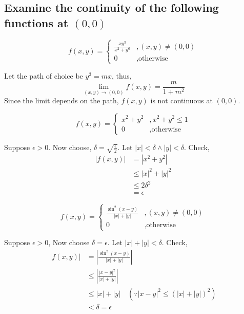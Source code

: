 \subsection{Examine the continuity of the following functions at $(0,0)$}
\begin{asign}
	\[f(x,y)=\begin{cases}
		\frac{xy^3}{x^2+y^6} &, (x,y)\neq(0,0)\\
		0 &, \text{otherwise}
	\end{cases}\]
\end{asign}
\begin{anse}
	Let the path of choice be $y^3=mx$, thus,
	\[\lim\limits_{(x,y)\to(0,0)}f(x,y)=\frac{m}{1+m^2}\]
	Since the limit depends on the path, $f(x,y)$ is not continuous at $(0,0)$.
\end{anse}
\begin{asign}
	\[f(x,y)=\begin{cases}
		x^2+y^2 &, 	x^2+y^2\leq 1\\
		0 &, \text{otherwise}
	\end{cases}\]
\end{asign}
\begin{anse}
	Suppose $\epsilon>0$. Now choose, $\delta=\sqrt{\frac{\epsilon}{2}}$. Let $|x|<\delta\land |y|<\delta$. Check,
	\[\begin{split}
		|f(x,y)|&=|x^2+y^2|\\
		&\leq |x|^2+|y|^2\\
		&\leq 2\delta^2\\
		&=\epsilon
	\end{split}\]
\end{anse}
\begin{asign}
	\[f(x,y)=\begin{cases}
		\frac{\sin^2(x-y)}{|x|+|y|} &, (x,y)\neq(0,0)\\
		0 &, \text{otherwise}
	\end{cases}\]
\end{asign}
\begin{anse}
	Suppose $\epsilon>0$, Now choose $\delta=\epsilon$. Let $|x|+|y|<\delta$. Check,
	\[\begin{split}
		|f(x,y)|&=\left|\frac{\sin^2(x-y)}{|x|+|y|}\right|\\
		&\leq \left|\frac{|x-y|^2}{|x|+|y|}\right|\\
		&\leq |x|+|y| \quad (\because |x-y|^2 \leq (|x|+|y|)^2)\\
		&<\delta=\epsilon
	\end{split}\]
\end{anse}
